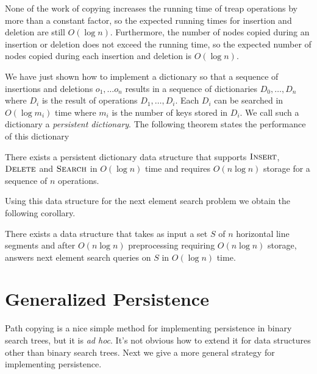 None of the work of copying increases the running time of treap
operations by more than a constant factor, so the expected running
times for insertion and deletion are still $O(\log n)$.  Furthermore,
the number of nodes copied during an insertion or deletion does not
exceed the running time, so the expected number of nodes copied during
each insertion and deletion is $O(\log n)$.

We have just shown how to implement a dictionary so that a sequence of
insertions and deletions $o_1,\ldots o_n$ results in a sequence of
dictionaries $D_0,\ldots,D_n$ where $D_i$ is the result of operations
$D_1,\ldots,D_i$.  Each $D_i$ can be searched in $O(\log m_i)$ time
where $m_i$ is the number of keys stored in $D_i$.  We call such a
dictionary a \emph{persistent dictionary}.  The following theorem
states the performance of this dictionary

\begin{thm}
There exists a persistent dictionary data structure that supports
$\textsc{Insert}$, $\textsc{Delete}$ and $\textsc{Search}$ in $O(\log
n)$ time and requires $O(n\log n)$ storage for a sequence of $n$
operations.
\end{thm}

Using this data structure for the next element search problem
we obtain the following corollary.

\begin{thm}
There exists a data structure that takes as input a set $S$ of $n$
horizontal line segments and after $O(n\log n)$ preprocessing
requiring $O(n\log n)$ storage, answers next element search queries on
$S$ in $O(\log n)$ time.
\end{thm}


\section{Generalized Persistence}

Path copying is a nice simple method for implementing persistence in
binary search trees, but it is \emph{ad hoc}.  It's not obvious how to
extend it for data structures other than binary search trees.  Next we
give a more general strategy for implementing persistence.

